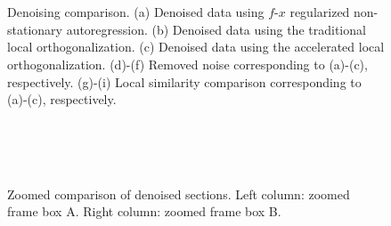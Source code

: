 \begin{figure}[htb!]
\centering
{}
\\
   \\  
\caption{Denoising comparison. (a) Denoised data using $f$-$x$ regularized non-stationary autoregression. (b) Denoised data using the traditional local orthogonalization. (c) Denoised data using the accelerated local orthogonalization. (d)-(f) Removed noise corresponding to (a)-(c), respectively. (g)-(i) Local similarity comparison corresponding to (a)-(c), respectively.}
\label{fig:npre0,rna-ortho0,rna-ortho20,nprediff0,rnadiff-ortho0,rnadiff-ortho20,rna-simi,rna-simi-ortho,rna-simi-ortho2}
\end{figure}


\begin{figure}[htb!]
\centering
{}
   \\
   \\
   \\  
\caption{Zoomed comparison of denoised sections. Left column: zoomed frame box A. Right column: zoomed frame box B.}
\label{fig:zoom-npre-a,zoom-npre-b,zoom-rna-ortho-a,zoom-rna-ortho-b,zoom-rna-ortho2-a,zoom-rna-ortho2-b}
\end{figure}


